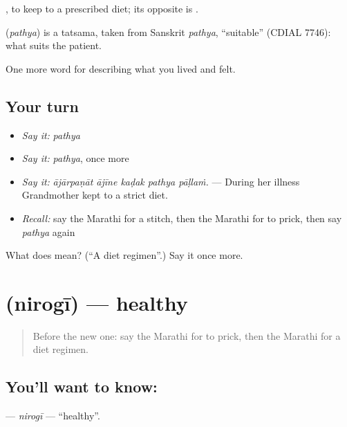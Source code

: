  , to keep to a prescribed diet; its opposite is .

\begin{cousinweb}
\textbf{} (\emph{pathya}) is a tatsama, taken from Sanskrit \emph{pathya}, \textquotedblleft{}suitable\textquotedblright{} (CDIAL 7746): what suits the patient.
\end{cousinweb}

\begin{grammarlens}[title={What you've built}]
One more word for describing what you lived and felt.
\end{grammarlens}

\subsection*{Your turn}
\begin{itemize}
\raggedright
  \item \emph{Say it:} \emph{pathya}
  \item \emph{Say it:} \emph{pathya}, once more
  \item \emph{Say it:} \emph{ājārpaṇāt ājīne kaḍak pathya pāḷlaṁ.} — During her illness Grandmother kept to a strict diet.
  \item \emph{Recall:} say the Marathi for a stitch, then the Marathi for to prick, then say \emph{pathya} again
\end{itemize}

\begin{tcolorbox}[breakable,colback=teal!4,colframe=teal!35!black,title={Before you move on}]
What does  mean? (\textquotedblleft{}A diet regimen\textquotedblright{}.) Say it once more.
\end{tcolorbox}
\section[\texorpdfstring{\mr{निरोगी} (nirogī)}{निरोगी (nirogī)}]{ (nirogī) — healthy}

\label{lesson:MR-C490-nirogi}



\begin{quote}
Before the new one: say the Marathi for to prick, then the Marathi for a diet regimen.
\end{quote}

\subsection*{You'll want to know: }
\textbf{} — \emph{nirogī} — \textquotedblleft{}healthy\textquotedblright{}.

